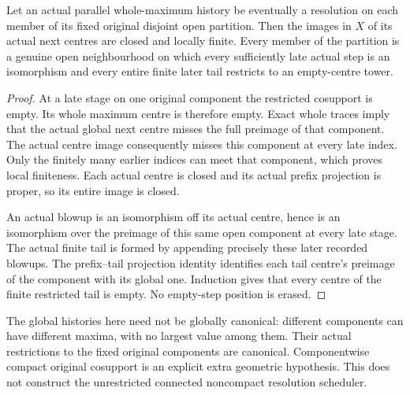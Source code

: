 \begin{theorem}
\label{hir:componentwise-history-locally-finite-empty-tails}
\leanok
Let an actual parallel whole-maximum history be eventually a
resolution on each member of its fixed original disjoint open
partition. Then the images in $X$ of its actual next centres
are closed and locally finite. Every member of the partition
is a genuine open neighbourhood on which every sufficiently
late actual step is an isomorphism and every entire finite
later tail restricts to an empty-centre tower.
\end{theorem}
\begin{proof}
At a late stage on one original component the restricted
cosupport is empty. Its whole maximum centre is therefore
empty. Exact whole traces imply that the actual global
next centre misses the full preimage of that component.
The actual centre image consequently misses this component
at every late index. Only the finitely many earlier indices
can meet that component, which proves local finiteness.
Each actual centre is closed and its actual prefix projection
is proper, so its entire image is closed.

An actual blowup is an isomorphism off its actual centre,
hence is an isomorphism over the preimage of this same open
component at every late stage. The actual finite tail is
formed by appending precisely these later recorded blowups.
The prefix--tail projection identity identifies each tail
centre's preimage of the component with its global one.
Induction gives that every centre of the finite restricted
tail is empty. No empty-step position is erased.
\end{proof}

\begin{remark}
The global histories here need not be globally canonical:
different components can have different maxima, with no
largest value among them. Their actual restrictions to the
fixed original components are canonical. Componentwise
compact original cosupport is an explicit extra geometric
hypothesis. This does not construct the unrestricted
connected noncompact resolution scheduler.
\end{remark}
